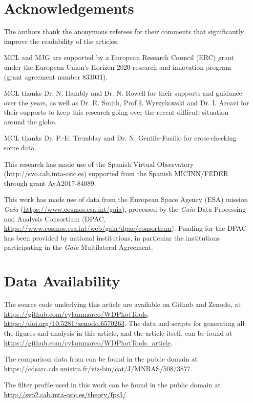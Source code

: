 \documentclass[fleqn,usenatbib]{rasti}
\begin{document}
\section*{Acknowledgements}
The authors thank the anonymous referees for their comments that significantly
improve the readability of the articles.

MCL and MJG are supported by a European Research Council (ERC) grant under the European
Union’s Horizon 2020 research and innovation program (grant agreement number
833031).

MCL thanks Dr. N. Hambly and Dr. N. Rowell for their supports and guidance over
the years, as well as Dr. R. Smith, Prof \L{} Wyrzykowski and Dr. I. Arcavi
for their supports to keep this research going over the recent difficult
situation around the globe.

MCL thanks Dr. P.-E. Tremblay and Dr. N. Gentile-Fusillo for cross-checking
some data.

This research has made use of the Spanish Virtual Observatory
(http://svo.cab.inta-csic.es) supported from the Spanish MICINN/FEDER through
grant AyA2017-84089.

This work has made use of data from the European Space Agency (ESA) mission
{\it Gaia} (\url{https://www.cosmos.esa.int/gaia}), processed by the {\it Gaia}
Data Processing and Analysis Consortium (DPAC,
\url{https://www.cosmos.esa.int/web/gaia/dpac/consortium}). Funding for the DPAC
has been provided by national institutions, in particular the institutions
participating in the {\it Gaia} Multilateral Agreement.

\section*{Data Availability}
The source code underlying this article are available on Github and Zenodo, at \url{https://github.com/cylammarco/WDPhotTools}, \url{https://doi.org/10.5281/zenodo.6570263}. The data and scripts for generating all the figures and analysis in this article, and the article itself, can be found at \url{https://github.com/cylammarco/WDPhotTools_article}.

The comparison data from \citet{2021MNRAS.508.3877G} can be found in the public domain at \url{https://cdsarc.cds.unistra.fr/viz-bin/cat/J/MNRAS/508/3877}.

The filter profile used in this work can be found in the public domain at \url{http://svo2.cab.inta-csic.es/theory/fps3/}.
\end{document}
